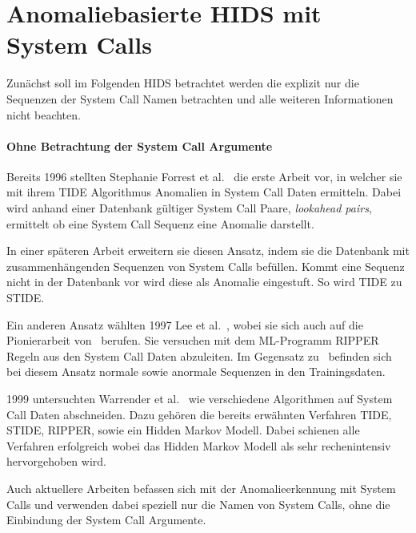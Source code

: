     \section{Anomaliebasierte \ac{HIDS} mit System Calls}

    Zunächst soll im Folgenden \ac{HIDS} betrachtet werden die explizit nur die Sequenzen der System Call Namen betrachten und alle weiteren Informationen nicht beachten.

    \paragraph{Ohne Betrachtung der System Call Argumente}\label{sec:related_no_arg}
        Bereits 1996 stellten Stephanie Forrest et al.~\cite{FORREST} die erste Arbeit vor, in welcher sie mit ihrem \ac{TIDE} Algorithmus Anomalien in System Call Daten ermitteln.
        Dabei wird anhand einer Datenbank gültiger System Call Paare, \textit{lookahead pairs}, ermittelt ob eine System Call Sequenz eine Anomalie darstellt.

        In einer späteren Arbeit erweitern sie diesen Ansatz, indem sie die Datenbank mit zusammenhängenden Sequenzen von System Calls befüllen.
        Kommt eine Sequenz nicht in der Datenbank vor wird diese als Anomalie eingestuft.
        So wird \ac{TIDE} zu \ac{STIDE}.~\cite{STIDE}

        Ein anderen Ansatz wählten 1997 Lee et al.~\cite{LEE1997}, wobei sie sich auch auf die Pionierarbeit von~\cite{FORREST} berufen.
        Sie versuchen mit dem \ac{ML}-Programm RIPPER Regeln aus den System Call Daten abzuleiten.
        Im Gegensatz zu~\cite{FORREST} befinden sich bei diesem Ansatz normale sowie anormale Sequenzen in den Trainingsdaten.

        1999 untersuchten Warrender et al.~\cite{STIDE_Alternatives} wie verschiedene Algorithmen auf System Call Daten abschneiden.
        Dazu gehören die bereits erwähnten Verfahren \ac{TIDE}, \ac{STIDE}, RIPPER, sowie ein Hidden Markov Modell.
        Dabei schienen alle Verfahren erfolgreich wobei das Hidden Markov Modell als sehr rechenintensiv hervorgehoben wird.
 
        Auch aktuellere Arbeiten befassen sich mit der Anomalieerkennung mit System Calls und verwenden dabei speziell nur die Namen von System Calls, ohne die Einbindung der System Call Argumente.
    
